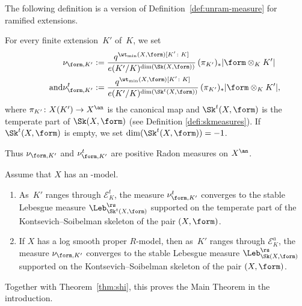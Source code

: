 The following definition is a version of Definition~\ref{def:unram-measure} for ramified extensions.
\begin{definition}\label{def:ram-measure}
For every finite extension~$K'$ of~$K$, we set\enlargethispage{.5\baselineskip}%
\begin{align*}
\nu_{\form,K'}&:=\frac{q^{\wt_{\min}(X,\form)[K' \colon K]}}{e(K'/K)^{\dim(\Sk(X,\form))}}\,
(\pi_{K'})_*|\form\otimes_K K'|\\
\tag*{and}
\nu^t_{\form,K'}&:=\frac{q^{\wt_{\min}(X,\form)[K' \colon K]}}{e(K'/K)^{\dim(\Sk^t(X,\form))}}\,
(\pi_{K'})_*|\form\otimes_K K'|,
\end{align*}
where $\pi_{K'}\colon X(K')\to X^{\an}$ is the canonical map and $\Sk^t(X,\form)$ is the temperate part of $\Sk(X,\form)$ (see Definition \ref{defi:skmeasures}). If $\Sk^t(X,\form)$ is empty, we set $\dim(\Sk^t(X,\form))=-1$.
\end{definition}
Thus $\nu_{\form,K'}$ and $\nu^t_{\form,K'}$ are positive Radon measures on $X^{\an}$.

\begin{theorem}\label{thm:padic}
Assume that $X$ has an \snc-model.
\begin{enumerate}
\item \label{it:maintame} As~$K'$ ranges through $\mathcal{E}^t_K$, the measure $\nu^t_{\form,K'}$
converges to the stable Lebesgue measure $\Leb^{\rs}_{\Sk^t(X,\form)}$
supported on the temperate part of the Kontsevich--Soibelman skeleton of the pair $(X,\form)$.
\item \label{it:mainwild} If $X$ has a log smooth proper $R$\nobreakdash-model, then as~$K'$ ranges through $\mathcal{E}^a_K$, the measure $\nu_{\form,K'}$
converges to the stable Lebesgue measure $\Leb^{\rs}_{\Sk(X,\form)}$
supported on the Kontsevich--Soibelman skeleton of the pair $(X,\form)$.
\end{enumerate}
\end{theorem}
Together with Theorem~\ref{thm:shi}, this proves the Main Theorem in the introduction.

